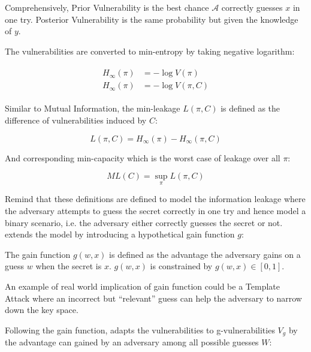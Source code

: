 Comprehensively, Prior Vulnerability is the best chance  $\mathcal{A}$ correctly guesses $x$ in one try. Posterior Vulnerability is the same probability but given the knowledge of $y$. 

\begin{definition}
	The vulnerabilities are converted to min-entropy by taking negative logarithm:
	
	\begin{eqnarray}
		\begin{aligned}
			H_{\infty}(\pi) &= -\log{V(\pi)} \\
			H_{\infty}(\pi) &= -\log{V(\pi,C)}
		\end{aligned}
	\end{eqnarray}
	
	Similar to Mutual Information, the min-leakage $L(\pi,C)$ is defined as the difference of vulnerabilities induced by $C$:
	
	\begin{equation}
		L(\pi, C) = H_{\infty}(\pi) - H_{\infty}(\pi, C)
	\end{equation}
	
	And corresponding min-capacity which is the worst case of leakage over all $\pi$:
	
	\begin{equation}
		ML(C) = \sup_{\pi}{L(\pi,C)}
	\end{equation}
\end{definition}

Remind that these definitions are defined to model the information leakage where the adversary attempts to guess the secret correctly in one try and hence model a binary scenario, i.e. the adversary either correctly guesses the secret or not. \cite{GLeakage} extends the model by introducing a hypothetical gain function $g$:

\begin{definition}
	The gain function $g(w,x)$ is defined as the advantage the adversary gains on a guess $w$ when the secret is $x$. $g(w,x)$ is constrained by $g(w,x) \in [0,1]$.
\end{definition}

An example of real world implication of gain function could be a Template Attack\cite{TemplateAttack} \cite{PracticalTemplate} where an incorrect but ``relevant'' guess can help the adversary to narrow down the key space.

Following the gain function, \cite{GLeakage} adapts the vulnerabilities to g-vulnerabilities $V_g$ by the advantage can gained by an adversary among all possible guesses $W$:

